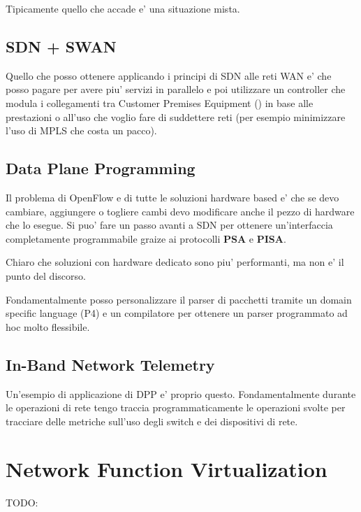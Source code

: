 
Tipicamente quello che accade e' una situazione mista.

\subsection{SDN + SWAN}

Quello che posso ottenere applicando i principi di SDN alle reti WAN e' che posso pagare per avere piu' servizi in parallelo e poi utilizzare un controller che modula i collegamenti tra Customer Premises Equipment () in base alle prestazioni o all'uso che voglio fare di suddettere reti (per esempio minimizzare l'uso di MPLS che costa un pacco).


\subsection{Data Plane Programming}

Il problema di OpenFlow e di tutte le soluzioni hardware based e' che se devo cambiare, aggiungere o togliere cambi devo modificare anche il pezzo di hardware che lo esegue. Si puo' fare un passo avanti a SDN per ottenere un'interfaccia completamente programmabile graize ai protocolli \textbf{PSA} e \textbf{PISA}.

Chiaro che soluzioni con hardware dedicato sono piu' performanti, ma non e' il punto del discorso.


Fondamentalmente posso personalizzare il parser di pacchetti tramite un domain specific language (P4) e un compilatore per ottenere un parser programmato ad hoc molto flessibile.


\subsection{In-Band Network Telemetry}

Un'esempio di applicazione di DPP e' proprio questo.
Fondamentalmente durante le operazioni di rete tengo traccia programmaticamente le operazioni svolte per tracciare delle metriche sull'uso degli switch e dei dispositivi di rete.


\section{Network Function Virtualization}

TODO:
